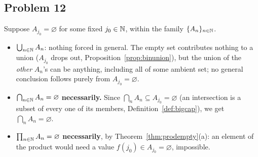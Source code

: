 \subsection*{Problem 12}
Suppose $A_{j_0}=\varnothing$ for some fixed $j_0\in\mathbb{N}$, within the family $\{A_n\}_{n\in\mathbb{N}}$.
\begin{itemize}
	\item $\bigcup_{n\in\mathbb{N}}A_n$: nothing forced in general. The empty set contributes nothing to a union ($A_{j_0}$ drops out, Proposition~\ref{prop:binunion}), but the union of the \emph{other} $A_n$'s can be anything, including all of some ambient set; no general conclusion follows purely from $A_{j_0}=\varnothing$.
	\item $\bigcap_{n\in\mathbb{N}}A_n=\varnothing$ \textbf{necessarily.} Since $\bigcap_nA_n\subseteq A_{j_0}=\varnothing$ (an intersection is a subset of every one of its members, Definition~\ref{def:bigcap}), we get $\bigcap_nA_n=\varnothing$.
	\item $\prod_{n\in\mathbb{N}}A_n=\varnothing$ \textbf{necessarily}, by Theorem~\ref{thm:prodempty}(a): an element of the product would need a value $f(j_0)\in A_{j_0}=\varnothing$, impossible.
\end{itemize}